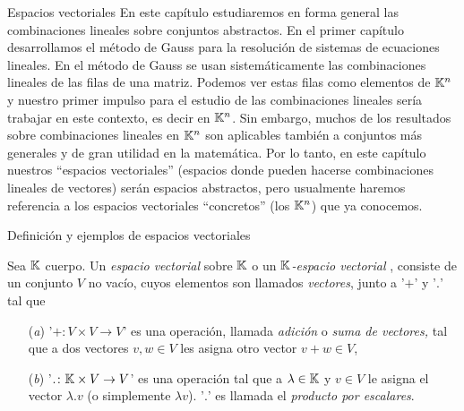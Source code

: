 


    \begin{chapter}{Espacios vectoriales}\label{chap-esp-vect} En este capítulo estudiaremos en forma general las combinaciones lineales sobre conjuntos abstractos.
        En el primer capítulo desarrollamos el método de Gauss para la resolución de sistemas de ecuaciones lineales. En el método de Gauss se usan sistemáticamente las combinaciones lineales de las filas de una matriz. Podemos ver estas filas como elementos de $\mathbb K^n$  y nuestro primer impulso para el estudio de las combinaciones lineales sería trabajar en este contexto, es decir  en $\mathbb K^n$.  Sin embargo, muchos de los resultados sobre combinaciones lineales en $\mathbb K^n$ son aplicables también a conjuntos más generales y de gran utilidad en la matemática. Por lo tanto, en este capítulo nuestros ``espacios vectoriales'' (espacios donde pueden hacerse combinaciones lineales de vectores) serán espacios abstractos, pero usualmente haremos referencia a los espacios vectoriales ``concretos'' (los $\mathbb K^n$) que ya conocemos. 
        
        
        \begin{section}{Definici\'on y ejemplos de espacios vectoriales}\label{seccion-definicion-de-espacios-vectoriales}
            
            \begin{definicion}\label{def-esp-vect} Sea $\mathbb K$ cuerpo. Un \textit{espacio vectorial} sobre $\mathbb K$ o un \textit{$\mathbb K$-espacio vectorial }, consiste de  un  conjunto $V$ no vacío, cuyos elementos son llamados \textit{vectores}, junto a  '$+$' y '$.$' tal que
                \begin{enumerate}
                    \item[(\textit{a})] '$+\colon V\times V\to V$' es una operación, llamada \textit{adición} o  \textit{suma de vectores,} tal que a dos vectores $v,w \in V$ les asigna otro vector $v+w \in V$,
                    \item[(\textit{b})]  '$.
                     \colon \mathbb K\times V\to V$' es una operación tal que a $\lambda \in \mathbb K$ y $v \in V$ le asigna el vector $\lambda.v$ (o simplemente $\lambda v$).  '$.$' es llamada  el \textit{producto por escalares}.
                     

\end{enumerate}
\end{definicion}
\end{section}
\end{chapter}
